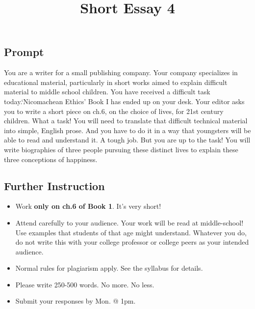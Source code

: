 \documentclass[]{article}
\title{Short Essay 4}
\date{}
\begin{document}
\maketitle

\subsection{Prompt}\label{prompt}

You are a writer for a small publishing company. Your company
specializes in educational material, particularly in short works aimed
to explain difficult material to middle school children. You have
received a difficult task today.`Nicomachean Ethics' Book I has ended up
on your desk. Your editor asks you to write a short piece on ch.6, on
the choice of lives, for 21st century children. What a task! You will
need to translate that difficult technical material into simple, English
prose. And you have to do it in a way that youngsters will be able to
read and understand it. A tough job. But you are up to the task! You
will write biographies of three people pursuing these distinct lives to
explain these three conceptions of happiness.

\subsection{Further Instruction}\label{further-instruction}

\begin{itemize}
\itemsep1pt\parskip0pt
\item
  Work \textbf{only on ch.6 of Book 1}. It's very short!
\item
  Attend carefully to your audience. Your work will be read at
  middle-school! Use examples that students of that age might
  understand. Whatever you do, do not write this with your college
  professor or college peers as your intended audience.
\item
  Normal rules for plagiarism apply. See the syllabus for details.
\item
  Please write 250-500 words. No more. No less.
\item
  Submit your responses by Mon. @ 1pm.
\end{itemize}
\end{document}
